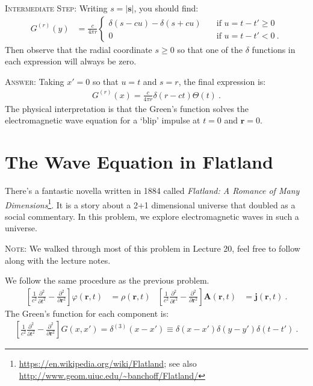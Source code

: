 \documentclass[12pt]{article}
\numberwithin{equation}{section}    %
\renewcommand{\vec}[1]{\mathbf{#1}} %
\begin{document}
\textsc{Intermediate Step}: Writing $s = |\vec s|$, you should find:
\begin{align}
	G^{(r)}(y) &=
	\frac{c}{4\pi r}
	\left\{
	\begin{array}{ll}
		\delta(s-cu) - \delta(s+cu)
		&
		\quad\text{if $u=t-t' \geq 0$}
		\\
		0 & \quad\text{if $u=t-t' <0$} \ .
	\end{array}
	\right.
	\label{eq:Gr:Gs}
\end{align}
Then observe that the radial coordinate $s\geq 0$ so that one of the $\delta$ functions in each expression will always be zero. 

\textsc{Answer}:
Taking $x' = 0$ so that $u=t$ and $s = r$, the final expression is:
\begin{align}
	G^{(r)}(x) = \frac{c}{4\pi r} \delta(r-ct) \Theta(t) \ .
	\label{eq:3d:G}
\end{align}
The physical interpretation is that the Green's function solves the electromagnetic wave equation for a `blip' impulse at $t=0$ and $\vec{r} = 0$. 




 





\section{The Wave Equation in Flatland}

There's a fantastic novella written in 1884 called \emph{Flatland: A Romance of Many Dimensions}\footnote{\url{https://en.wikipedia.org/wiki/Flatland}; see also \url{http://www.geom.uiuc.edu/~banchoff/Flatland/}}. It is a story about a 2+1 dimensional universe that doubled as a social commentary. In this problem, we explore electromagnetic waves in such a universe. 

\textsc{Note}: We walked through most of this problem in Lecture 20, feel free to follow along with the lecture notes.


We follow the same procedure as the previous problem.
\begin{align}
	\left[\frac{1}{c^2}\frac{\partial^2}{\partial t^2} - \frac{\partial^2}{\partial \vec{r}^2}\right] 
	\varphi(\vec{r},t) &= \rho(\vec{r},t)
	&
	\left[\frac{1}{c^2}\frac{\partial^2}{\partial t^2} - \frac{\partial^2}{\partial \vec{r}^2}\right]
	\vec A(\vec{r},t) &= \vec j(\vec{r},t) \ .
	\label{eq:EM:wave}
\end{align}
The Green's function for each component is:
\begin{align}
	\left[\frac{1}{c^2}\frac{\partial^2}{\partial t^2} - \frac{\partial^2}{\partial \vec{r}^2}\right] G(x,x') = \delta^{(3)}(x-x') \equiv \delta(x-x')\delta(y-y')\delta(t-t') \ .
	\label{eq:HO:in:3d}
\end{align}
\end{document}
